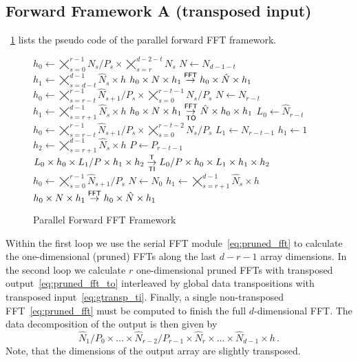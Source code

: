 \subsection{Forward Framework A (transposed input)}
\figurename{}~\ref{fig:fft_forw} lists the pseudo code of the parallel forward FFT framework.
\begin{figure}[ht]
  \begin{algorithmic}[1]
      \State $h_0 \gets \bigtimes_{s=0}^{r-1} N_s/P_s \times \bigtimes_{s=r}^{d-2-t} N_s$
      \State $N   \gets N_{d-1-t}$
      \State $h_1 \gets \bigtimes_{s=d-t}^{d-1} \hat N_s \times h$
      \State $h_0 \times N \times h_1 \overset{\textsf{FFT}}{\rightarrow} h_0 \times \hat N \times h_1$
    \EndFor
      \State $h_0 \gets \bigtimes_{s=r-t}^{r-1} \hat N_{s+1}/P_s \times \bigtimes_{s=0}^{r-t-1} N_s/P_s$
      \State $N   \gets N_{r-t}$
      \State $h_1 \gets \bigtimes_{s=r+1}^{d-1} \hat N_s \times h$
      \State $h_0 \times N \times h_1 \overset{\textsf{FFT}}{\underset{\textsf{TO}}{\rightarrow}} \hat N \times h_0 \times h_1$
      \State
      \State $L_0 \gets \hat N_{r-t}$
      \State $h_0 \gets \bigtimes_{s=r-t}^{r-1}\hat N_{s+1}/P_{s} \times \bigtimes_{s=0}^{r-t-2} N_s/P_s$
      \State $L_1 \gets N_{r-t-1}$
      \State $h_1 \gets 1$
      \State $h_2 \gets \bigtimes_{s=r+1}^{d-1} \hat N_s \times h$
      \State $P   \gets P_{r-t-1}$
      \State $L_0 \times h_0 \times L_1/P \times h_1 \times h_2\overset{\textsf{T}}{\underset{\textsf{TI}}{\rightarrow}} L_0/P \times h_0 \times L_1 \times h_1 \times h_2$
    \EndFor
    \State $h_0 \gets \bigtimes_{s=0}^{r-1}\hat N_{s+1}/P_s$
    \State $N   \gets N_0$
    \State $h_1 \gets \bigtimes_{s=r+1}^{d-1} \hat N_s \times h$
    \State $h_0 \times N \times h_1 \overset{\textsf{FFT}}{\rightarrow} h_0 \times \hat N \times h_1$
  \end{algorithmic}
  \caption{Parallel Forward FFT Framework}\label{fig:fft_forw}
\end{figure}

Within the first loop we use the serial FFT module~\eqref{eq:pruned_fft} to calculate
the one-dimensional (pruned) FFTs along the last $d-r-1$ array dimensions.
In the second loop we calculate $r$ one-dimensional pruned FFTs with transposed output~\eqref{eq:pruned_fft_to}
interleaved by global data transpositions with transposed input~\eqref{eq:gtransp_ti}.
Finally, a single non-transposed FFT~\eqref{eq:pruned_fft} must be computed to finish the full $d$-dimensional FFT.
The data decomposition of the output is then given by
\begin{equation*}
  \hat N_1/P_0 \times \hdots \times \hat N_{r-2}/P_{r-1} \times \hat N_r \times \hdots \times \hat N_{d-1} \times h\,.
\end{equation*}
Note, that the dimensions of the output array are slightly transposed.


